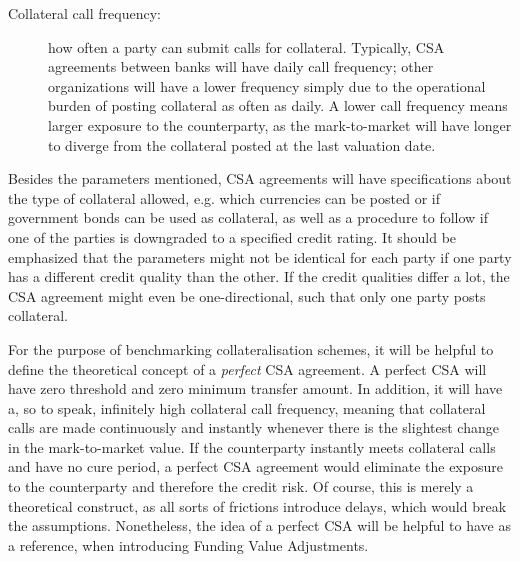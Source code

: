 \documentclass[main.tex]{subfiles}
\begin{document}
\begin{description}
            \item[Collateral call frequency:]
            how often a party can submit calls for collateral.
            Typically, CSA agreements between banks will have daily call frequency;
            other organizations will have a lower frequency simply due to the operational burden
            of posting collateral as often as daily. 
            A lower call frequency means larger exposure to the counterparty,
            as the mark-to-market will have longer to diverge from the collateral posted 
            at the last valuation date.
        \end{description}

        Besides the parameters mentioned, CSA agreements will have specifications about the type of collateral allowed,
        e.g. which currencies can be posted or if government bonds can be used as collateral,
        as well as a procedure to follow if one of the parties is downgraded to a specified credit rating.
        It should be emphasized that the parameters might not be identical for each party
        if one party has a different credit quality than the other.
        If the credit qualities differ a lot, the CSA agreement might even be one-directional,
        such that only one party posts collateral.

        For the purpose of benchmarking collateralisation schemes, 
        it will be helpful to define the theoretical concept of a \textit{perfect} CSA agreement.
        A perfect CSA will have zero threshold and zero minimum transfer amount.
        In addition, it will have a, so to speak, infinitely high collateral call frequency,
        meaning that collateral calls are made continuously and instantly 
        whenever there is the slightest change in the mark-to-market value. 
        If the counterparty instantly meets collateral calls and have no cure period,
        a perfect CSA agreement would eliminate the exposure to the counterparty
        and therefore the credit risk.
        Of course, this is merely a theoretical construct, as all sorts of frictions introduce delays,
        which would break the assumptions.
        Nonetheless, the idea of a perfect CSA will be helpful to have as a reference,
        when introducing Funding Value Adjustments.
\end{document}
